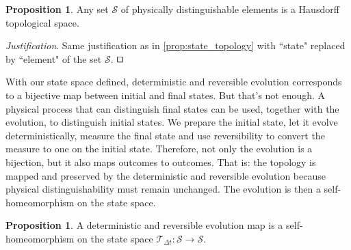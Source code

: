 \documentclass[smallextended]{svjour3}
\numberwithin{equation}{section}
\newenvironment{justification}{\emph{Justification}.}{\hfill\(\qed\)}
\theoremstyle{definition}
\newtheorem{prop}[equation]{Proposition}
\newenvironment{justification}{\emph{Justification}.}{\qed}
\newcommand{\journal}[1]{\ifjournal#1\fi}
\begin{document}
\begin{prop}\label{prop:topology}
	Any set $\mathcal{S}$ of physically distinguishable elements is a Hausdorff topological space.
\end{prop}

\begin{justification}
	Same justification as in \ref{prop:state_topology} with ``state" replaced by ``element" of the set $\mathcal{S}$.
\end{justification}

With our state space defined, deterministic and reversible evolution corresponds to a bijective map between initial and final states. But that's not enough. A physical process that can distinguish final states can be used, together with the evolution, to distinguish initial states. We prepare the initial state, let it evolve deterministically, measure the final state and use reversibility to convert the measure to one on the initial state. Therefore, not only the evolution is a bijection, but it also maps outcomes to outcomes. That is: the topology is mapped and preserved by the deterministic and reversible evolution because physical distinguishability must remain unchanged. The evolution is then a self-homeomorphism on the state space.

\begin{prop}\label{prop:homeomorphism}
A deterministic and reversible evolution map is a self-\journal{\break}homeomorphism on the state space $\mathcal{T}_{\Delta t}:\mathcal{S} \rightarrow \mathcal{S}$.
\end{prop}
\end{document}
